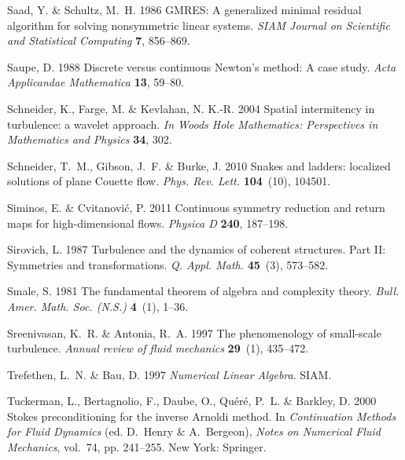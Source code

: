 \documentclass{article}
\begin{document}
\begin{thebibliography}{68}
{\sc Saad, Y. \& Schultz, M.~H.} 1986 {GMRES}: A generalized minimal residual
  algorithm for solving nonsymmetric linear systems. {\em SIAM Journal on
  Scientific and Statistical Computing\/} {\bf 7}, 856--869.

{\sc Saupe, D.} 1988 Discrete versus continuous {N}ewton's method: A case
  study. {\em Acta Applicandae Mathematica\/} {\bf 13}, 59--80.

{\sc Schneider, K., Farge, M. \& Kevlahan, N. K.-R.} 2004 Spatial intermitency
  in turbulence: a wavelet approach. {\em In Woods Hole Mathematics:
  Perspectives in Mathematics and Physics\/} {\bf 34}, 302.

{\sc Schneider, T.~M., Gibson, J.~F. \& Burke, J.} 2010 Snakes and ladders:
  localized solutions of plane {C}ouette flow. {\em Phys. Rev. Lett.\/} {\bf
  104}~(10), 104501.

{\sc Siminos, E. \& Cvitanovi{\'c}, P.} 2011 Continuous symmetry reduction and
  return maps for high-dimensional flows. {\em Physica D\/} {\bf 240},
  187--198.

{\sc Sirovich, L.} 1987 Turbulence and the dynamics of coherent structures.
  {Part II}: {Symmetries} and transformations. {\em Q. Appl. Math.\/} {\bf
  45}~(3), 573--582.

{\sc Smale, S.} 1981 The fundamental theorem of algebra and complexity theory.
  {\em Bull. Amer. Math. Soc. (N.S.)\/} {\bf 4}~(1), 1--36.

{\sc Sreenivasan, K.~R. \& Antonia, R.~A.} 1997 The phenomenology of
  small-scale turbulence. {\em Annual review of fluid mechanics\/} {\bf
  29}~(1), 435--472.

{\sc Trefethen, L.~N. \& Bau, D.} 1997 {\em Numerical Linear Algebra\/}. SIAM.

{\sc Tuckerman, L., Bertagnolio, F., Daube, O., Qu\'er\'e, P.~L. \& Barkley,
  D.} 2000 Stokes preconditioning for the inverse {A}rnoldi method. In {\em
  Continuation Methods for Fluid Dynamics\/} (ed. D.~Henry \& A.~Bergeon), {\em
  Notes on Numerical Fluid Mechanics\/}, vol.~74, pp. 241--255. New York:
  Springer.


\end{thebibliography}
\end{document}
